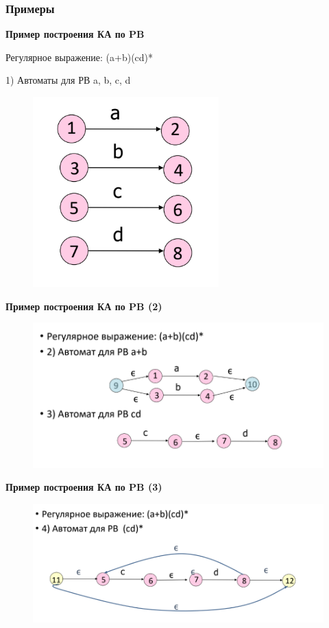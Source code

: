 \documentclass{article}
\begin{document}
\subsubsection{Примеры}

\textbf{Пример построения КА по PB}

 Регулярное выражение: (a+b)(cd)*

 1) Автоматы для РВ a, b, c, d

 \begin{figure}[H]
    \centering
    \includegraphics[width=0.30\linewidth]{Снимок экрана 2025-03-20 085702.png}
\end{figure}

\textbf{Пример построения КА по PB (2)}

\begin{figure}[H]
    \centering
    \includegraphics[width=1\linewidth]{Снимок экрана 2025-03-20 085742.png}
\end{figure}

\textbf{Пример построения КА по PB (3)}

\begin{figure}[H]
    \centering
    \includegraphics[width=1\linewidth]{Снимок экрана 2025-03-20 090034.png}
\end{figure}
\end{document}
